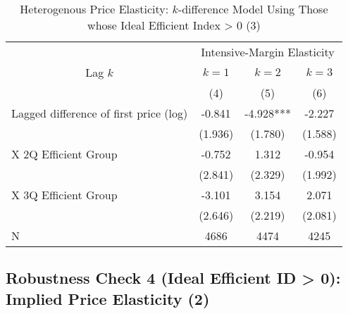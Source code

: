\documentclass[ review  , 3p ]{elsarticle}
\begin{document}
  \begin{table}

  \caption{\label{tab:kableSubsetHeterokDiffElasticitySlide3}Heterogenous Price Elasticity: $k$-difference Model Using Those whose Ideal Efficient Index > 0 (3)}
  \centering
  \fontsize{8}{10}\selectfont
  \begin{tabular}[t]{lccc}
  \toprule
  \multicolumn{1}{c}{ } & \multicolumn{3}{c}{Intensive-Margin Elasticity} \\
  \cmidrule(l{3pt}r{3pt}){2-4}
  \multicolumn{1}{c}{Lag $k$} & \multicolumn{1}{c}{$k = 1$} & \multicolumn{1}{c}{$k = 2$} & \multicolumn{1}{c}{$k = 3$} \\
  \cmidrule(l{3pt}r{3pt}){1-1} \cmidrule(l{3pt}r{3pt}){2-2} \cmidrule(l{3pt}r{3pt}){3-3} \cmidrule(l{3pt}r{3pt}){4-4}
   & (4) & (5) & (6)\\
  \midrule
  Lagged difference of first price (log) & -0.841 & -4.928*** & -2.227\\
   & (1.936) & (1.780) & (1.588)\\
  \hspace{1em}X 2Q Efficient Group & -0.752 & 1.312 & -0.954\\
   & (2.841) & (2.329) & (1.992)\\
  \hspace{1em}X 3Q Efficient Group & -3.101 & 3.154 & 2.071\\
   & (2.646) & (2.219) & (2.081)\\
  N & 4686 & 4474 & 4245\\
  \bottomrule
  \end{tabular}
  \end{table}

  \hypertarget{robustness-check-4-ideal-efficient-id-0-implied-price-elasticity-2}{%
  \subsection{Robustness Check 4 (Ideal Efficient ID \textgreater{} 0): Implied Price Elasticity (2)}\label{robustness-check-4-ideal-efficient-id-0-implied-price-elasticity-2}}
\end{document}
